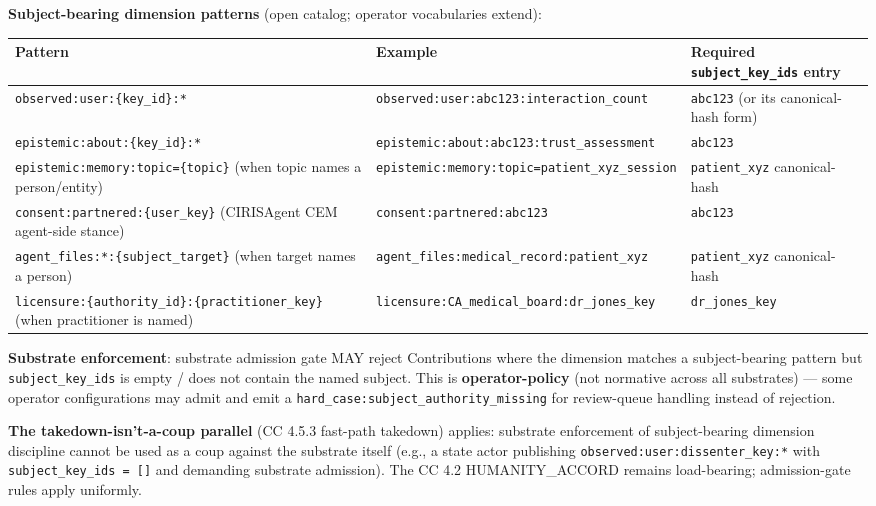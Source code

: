 \documentclass[11pt]{article}
\begin{document}
\textbf{Subject-bearing dimension patterns} (open catalog; operator vocabularies extend):


{\footnotesize
\begin{longtable}{|p{5.33cm}|p{5.33cm}|p{5.33cm}|}\hline
\textbf{Pattern} & \textbf{Example} & \textbf{Required \texttt{subject\_key\_ids} entry} \\ \hline\endhead
\texttt{observed:user:\{key\_id\}:*} & \texttt{observed:user:abc123:interaction\_count} & \texttt{abc123} (or its canonical-hash form) \\ \hline
\texttt{epistemic:about:\{key\_id\}:*} & \texttt{epistemic:about:abc123:trust\_assessment} & \texttt{abc123} \\ \hline
\texttt{epistemic:memory:topic=\{topic\}} (when topic names a person/entity) & \texttt{epistemic:memory:topic=patient\_xyz\_session} & \texttt{patient\_xyz} canonical-hash \\ \hline
\texttt{consent:partnered:\{user\_key\}} (CIRISAgent CEM agent-side stance) & \texttt{consent:partnered:abc123} & \texttt{abc123} \\ \hline
\texttt{agent\_files:*:\{subject\_target\}} (when target names a person) & \texttt{agent\_files:medical\_record:patient\_xyz} & \texttt{patient\_xyz} canonical-hash \\ \hline
\texttt{licensure:\{authority\_id\}:\{practitioner\_key\}} (when practitioner is named) & \texttt{licensure:CA\_medical\_board:dr\_jones\_key} & \texttt{dr\_jones\_key} \\ \hline
\end{longtable}}


\textbf{Substrate enforcement}: substrate admission gate MAY reject Contributions where the dimension matches a subject-bearing pattern but \texttt{subject\_key\_ids} is empty / does not contain the named subject. This is \textbf{operator-policy} (not normative across all substrates) — some operator configurations may admit and emit a \texttt{hard\_case:subject\_authority\_missing} for review-queue handling instead of rejection.


\textbf{The takedown-isn't-a-coup parallel} (CC 4.5.3 fast-path takedown) applies: substrate enforcement of subject-bearing dimension discipline cannot be used as a coup against the substrate itself (e.g., a state actor publishing \texttt{observed:user:dissenter\_key:*} with \texttt{subject\_key\_ids = []} and demanding substrate admission). The CC 4.2 HUMANITY\_ACCORD remains load-bearing; admission-gate rules apply uniformly.
\end{document}
